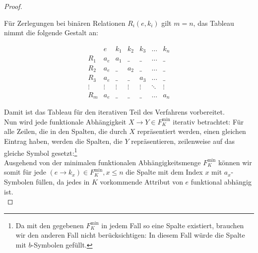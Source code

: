 \begin{proof}
    \noindent
    \begin{tcolorbox}[excursusbox, title={Tableau für binäre Relationen}]
    Für Zerlegungen bei binären Relationen $R_{i}(e, k_i)$ gilt $m = n$, das Tableau nimmt die folgende Gestalt an:

    \[
        \begin{array}{c|cccccc}
            & e      & k_1 & k_2 & k_3 & \dots  & k_n \\
            \hline
            R_{1}      & a_e     & a_1         & \_         & \_         & \dots  & \_         \\
            R_{2}      & a_e     & \_         & a_2         & \_         & \dots  & \_         \\
            R_{3}      & a_e     & \_         & \_         & a_3        & \dots  & \_         \\
            \vdots          & \vdots & \vdots     & \vdots     & \vdots     & \ddots & \vdots     \\
            R_{m}      & a_e     & \_         & \_         & \_         & \dots  & a_n
        \end{array}
    \]
    \end{tcolorbox}
    \medskip

    Damit ist das Tableau für den iterativen Teil des Verfahrens vorbereitet.\\

    \noindent
    Nun wird jede funktionale Abhängigkeit $X \rightarrow Y \in F^\text{min}_{K}$ iterativ betrachtet: Für alle Zeilen, die in den Spalten, die durch $X$ repräsentiert werden, einen gleichen Eintrag haben, werden die Spalten, die $Y$ repräsentieren, zeilenweise auf das gleiche Symbol gesetzt:\footnote{
        Da mit den gegebenen $F^\text{min}_{K}$ in jedem Fall so eine Spalte existiert, brauchen wir den anderen Fall nicht berücksichtigen: In diesem Fall würde die Spalte mit $b$-Symbolen gefüllt.
    }\\
    Ausgehend von der minimalen funktionalen Abhängigkeitsmenge $F^\text{min}_{K}$ können wir somit für jede $(e \rightarrow k_x) \in F^\text{min}_{K}, x \leq n$ die Spalte mit dem Index $x$ mit $a_x$-Symbolen füllen, da jedes in $K$ vorkommende Attribut von $e$ funktional abhängig ist.\\


\end{proof}
